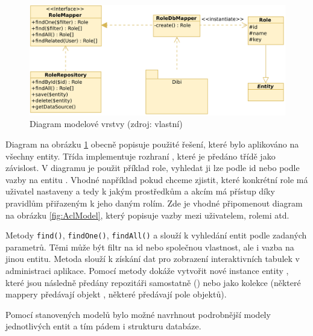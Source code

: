 \begin{figure}[h]
	\centering
	\includegraphics[width=\linewidth]{svg/roleMapper.png}
	\captionsetup{width=\linewidth}
	\caption[Diagram modelové vrstvy]{Diagram modelové vrstvy (zdroj: vlastní)}
	\label{fig:RoleMapper}
\end{figure}

Diagram na obrázku \ref{fig:RoleMapper} obecně popisuje použité řešení, které bylo aplikováno na všechny entity. Třída  implementuje rozhraní , které je předáno třídě  jako závislost. V diagramu je použit příklad role, vyhledat ji lze podle id nebo podle vazby na entitu . Vhodné například pokud chceme zjistit, které konkrétní role má uživatel nastaveny a tedy k jakým prostředkům a akcím má přístup díky pravidlům přiřazeným k jeho daným rolím. Zde je vhodné připomenout diagram na obrázku \ref{fig:AclModel}, který popisuje vazby mezi uživatelem, rolemi atd.

Metody \texttt{find()}, \texttt{findOne()}, \texttt{findAll()} a  slouží k vyhledání entit podle zadaných parametrů. Těmi může být filtr na id nebo společnou vlastnost, ale i vazba na jinou entitu. Metoda  slouží k získání dat pro zobrazení interaktivních tabulek v administraci aplikace. Pomocí metody  dokáže vytvořit nové instance entity , které jsou následně předány repozitáři samostatně () nebo jako kolekce (některé mappery předávají objekt , některé předávají pole objektů).
\clearpage

Pomocí stanovených modelů bylo možné navrhnout podrobnější modely jednotlivých entit a tím pádem i strukturu databáze.

